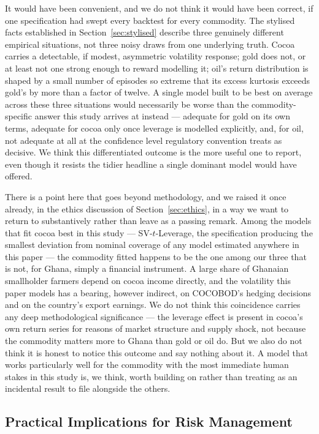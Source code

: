 \documentclass[preprint,12pt,authoryear]{elsarticle}
\begin{document}
It would have been convenient, and we do not think it would have been correct, if one specification had swept every backtest for every commodity. The stylised facts established in Section~\ref{sec:stylised} describe three genuinely different empirical situations, not three noisy draws from one underlying truth. Cocoa carries a detectable, if modest, asymmetric volatility response; gold does not, or at least not one strong enough to reward modelling it; oil's return distribution is shaped by a small number of episodes so extreme that its excess kurtosis exceeds gold's by more than a factor of twelve. A single model built to be best on average across these three situations would necessarily be worse than the commodity-specific answer this study arrives at instead --- adequate for gold on its own terms, adequate for cocoa only once leverage is modelled explicitly, and, for oil, not adequate at all at the confidence level regulatory convention treats as decisive. We think this differentiated outcome is the more useful one to report, even though it resists the tidier headline a single dominant model would have offered.

There is a point here that goes beyond methodology, and we raised it once already, in the ethics discussion of Section~\ref{sec:ethics}, in a way we want to return to substantively rather than leave as a passing remark. Among the models that fit cocoa best in this study --- SV-$t$-Leverage, the specification producing the smallest deviation from nominal coverage of any model estimated anywhere in this paper --- the commodity fitted happens to be the one among our three that is not, for Ghana, simply a financial instrument. A large share of Ghanaian smallholder farmers depend on cocoa income directly, and the volatility this paper models has a bearing, however indirect, on COCOBOD's hedging decisions and on the country's export earnings. We do not think this coincidence carries any deep methodological significance --- the leverage effect is present in cocoa's own return series for reasons of market structure and supply shock, not because the commodity matters more to Ghana than gold or oil do. But we also do not think it is honest to notice this outcome and say nothing about it. A model that works particularly well for the commodity with the most immediate human stakes in this study is, we think, worth building on rather than treating as an incidental result to file alongside the others.

\subsection{Practical Implications for Risk Management}
\end{document}
